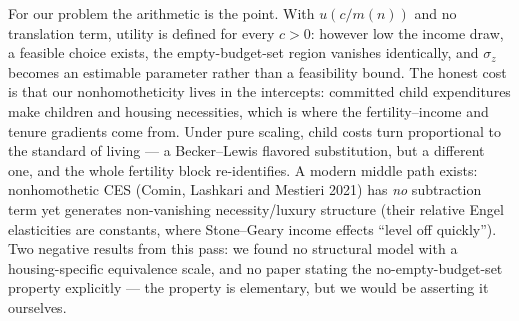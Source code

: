 \documentclass[10pt]{article}
\begin{document}
For our problem the arithmetic is the point. With $u(c/m(n))$ and no
translation term, utility is defined for every $c>0$: however low the income
draw, a feasible choice exists, the empty-budget-set region vanishes
identically, and $\sigma_z$ becomes an estimable parameter rather than a
feasibility bound. The honest cost is that our nonhomotheticity lives in the
intercepts: committed child expenditures make children and housing
necessities, which is where the fertility--income and tenure gradients come
from. Under pure scaling, child costs turn proportional to the standard of
living --- a Becker--Lewis flavored substitution, but a different one, and
the whole fertility block re-identifies. A modern middle path exists:
nonhomothetic CES (Comin, Lashkari and Mestieri 2021) has \emph{no}
subtraction term yet generates non-vanishing necessity/luxury structure
(their relative Engel elasticities are constants, where Stone--Geary income
effects ``level off quickly''). Two negative results from this pass: we
found no structural model with a housing-specific equivalence scale, and no
paper stating the no-empty-budget-set property explicitly --- the property is
elementary, but we would be asserting it ourselves.
\end{document}
